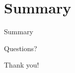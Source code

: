 \documentclass{beamer}
\begin{document}
\section{Summary}

\begin{frame}{}
	\begin{center}
		\Huge{Summary}
	\end{center}
\end{frame}

\begin{frame}{Questions?}
	\begin{center}
		\Huge{Thank you!}
	\end{center}
\end{frame}
\end{document}
